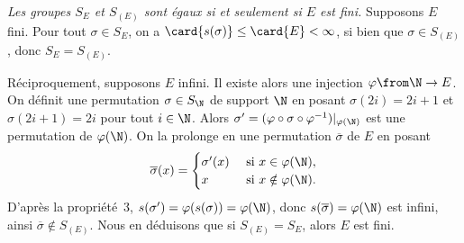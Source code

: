\begin{enumerate}
    \emph{Les groupes $S_E$ et $S_{(E)}$ sont égaux si et seulement si $E$ est fini.}
    Supposons $E$ fini. Pour tout $\sigma\in S_E$, on a $\card{s(\sigma)}\leq \card{E} < \infty$,  si bien que $\sigma\in S_{(E)}$, donc $S_E = S_{(E)}$.

    Réciproquement, supposons $E$ infini. 
    Il existe alors une injection $\varphi\from\N\to E$. On définit une permutation $\sigma\in S_\N$ de support $\N$ en posant $\sigma(2i)=2i+1$ et $\sigma(2i+1)=2i$ pour tout $i\in\N$.
    Alors $\sigma' = (\varphi\circ\sigma\circ\varphi^{-1})|_{\varphi(\N)}$ est une permutation de $\varphi(\N)$. 
    On la prolonge en une permutation $\overline{\sigma}$ de $E$ en posant
    \[
      \overline{\sigma}(x) = 
      \begin{cases} 
        \sigma'(x) & \text{ si } x\in\varphi(\N), \\ 
        x          & \text{ si } x\notin\varphi(\N). 
      \end{cases}
    \]
    D'après la propriété~3, $s(\sigma') = \varphi(s(\sigma)) = \varphi(\N)$, donc $s(\overline{\sigma}) = \varphi(\N)$ est infini, ainsi $\overline{\sigma}\notin S_{(E)}$. 
    Nous en déduisons que si $S_{(E)} = S_E$, alors  $E$ est fini.


\end{enumerate}
